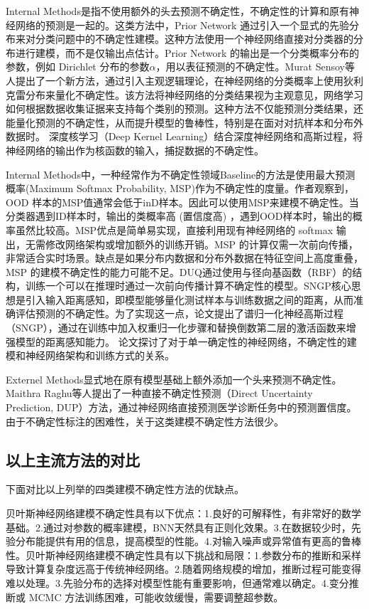 Internal Methods是指不使用额外的头去预测不确定性，不确定性的计算和原有神经网络的预测是一起的。这类方法中，Prior Network\cite{malinin2018predictive} 通过引入一个显式的先验分布来对分类问题中的不确定性建模。这种方法使用一个神经网络直接对分类器的分布进行建模，而不是仅输出点估计。Prior Network 的输出是一个分类概率分布的参数，例如 Dirichlet 分布的参数$\alpha$，用以表征预测的不确定性。Murat Sensoy等人\cite{sensoy2018evidential}提出了一个新方法，通过引入主观逻辑理论，在神经网络的分类概率上使用狄利克雷分布来量化不确定性。该方法将神经网络的分类结果视为主观意见，网络学习如何根据数据收集证据来支持每个类别的预测。这种方法不仅能预测分类结果，还能量化预测的不确定性，从而提升模型的鲁棒性，特别是在面对对抗样本和分布外数据时。
深度核学习（Deep Kernel Learning）\cite{van2021feature}结合深度神经网络和高斯过程，将神经网络的输出作为核函数的输入，捕捉数据的不确定性。

Internal Methods中，一种经常作为不确定性领域Baseline的方法是使用最大预测概率\cite{hendrycks2017a}(Maximum Softmax Probability, MSP)作为不确定性的度量。作者观察到，OOD 样本的MSP值通常会低于inD样本。因此可以使用MSP来建模不确定性。当分类器遇到ID样本时，输出的类概率高 (置信度高) ，遇到OOD样本时，输出的概率虽然比较高。MSP优点是简单易实现，直接利用现有神经网络的 softmax 输出，无需修改网络架构或增加额外的训练开销。MSP 的计算仅需一次前向传播，非常适合实时场景。缺点是如果分布内数据和分布外数据在特征空间上高度重叠，MSP 的建模不确定性的能力可能不足。DUQ\cite{van2020uncertainty}通过使用与径向基函数（RBF）的结构，训练一个可以在推理时通过一次前向传播计算不确定性的模型。SNGP\cite{liu2020simple}核心思想是引入输入距离感知，即模型能够量化测试样本与训练数据之间的距离，从而准确评估预测的不确定性。为了实现这一点，论文提出了谱归一化神经高斯过程（SNGP），通过在训练中加入权重归一化步骤和替换倒数第二层的激活函数来增强模型的距离感知能力。
论文\cite{charpentier2023training}探讨了对于单一确定性的神经网络，不确定性的建模和神经网络架构和训练方式的关系。

Externel Methods显式地在原有模型基础上额外添加一个头来预测不确定性。Maithra Raghu等人\cite{raghu2019direct}提出了一种直接不确定性预测（Direct Uncertainty Prediction, DUP）方法，通过神经网络直接预测医学诊断任务中的预测置信度。由于不确定性标注的困难性，关于这类建模不确定性方法很少。


\subsection{以上主流方法的对比}
下面对比以上列举的四类建模不确定性方法的优缺点。

贝叶斯神经网络建模不确定性具有以下优点：1.良好的可解释性，有非常好的数学基础。2.通过对参数的概率建模，BNN天然具有正则化效果。3.在数据较少时，先验分布能提供有用的信息，提高模型的性能。4.对输入噪声或异常值有更高的鲁棒性。贝叶斯神经网络建模不确定性具有以下挑战和局限：1.参数分布的推断和采样导致计算复杂度远高于传统神经网络。2.随着网络规模的增加，推断过程可能变得难以处理。3.先验分布的选择对模型性能有重要影响，但通常难以确定。4.变分推断或 MCMC 方法训练困难，可能收敛缓慢，需要调整超参数。


